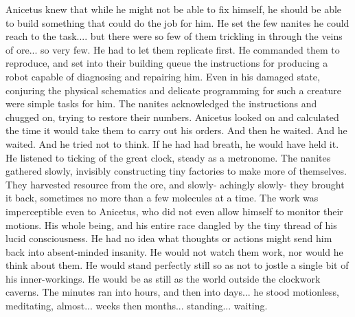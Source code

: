 \documentclass[a4paper]{article}
\begin{document}
Anicetus knew that while he might not be able to fix himself, he should be able to build something that could do the job for him. He set the few nanites he could reach to the task.... but there were so few of them trickling in through the veins of ore... so very few. He had to let them replicate first.
He commanded them to reproduce, and set into their building queue the instructions for producing a robot capable of diagnosing and repairing him. Even in his damaged state, conjuring the physical schematics and delicate programming for such a creature were simple tasks for him. The nanites acknowledged the instructions and chugged on, trying to restore their numbers.
Anicetus looked on and calculated the time it would take them to carry out his orders. And then he waited. And he waited. And he tried not to think. If he had had breath, he would have held it. He listened to ticking of the great clock, steady as a metronome.
The nanites gathered slowly, invisibly constructing tiny factories to make more of themselves. They harvested resource from the ore, and slowly- achingly slowly- they brought it back, sometimes no more than a few molecules at a time. The work was imperceptible even to Anicetus, who did not even allow himself to monitor their motions. His whole being, and his entire race dangled by the tiny thread of his lucid consciousness. He had no idea what thoughts or actions might send him back into absent-minded insanity. He would not watch them work, nor would he think about them. He would stand perfectly still so as not to jostle a single bit of his inner-workings. He would be as still as the world outside the clockwork caverns.
The minutes ran into hours, and then into days... he stood motionless, meditating, almost... weeks then months... standing... waiting.
\end{document}
